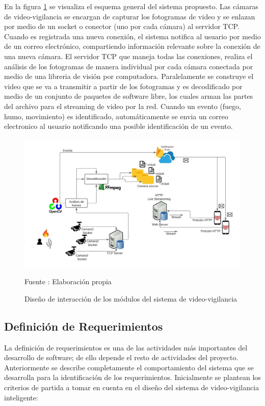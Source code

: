 En la figura \ref{fig:system_desing} se visualiza el esquema general del sistema propuesto. Las cámaras de video-vigilancia se encargan de capturar los fotogramas de video y se enlazan por medio de un socket o conector (uno por cada cámara) al servidor TCP. Cuando es registrada una nueva conexión, el sistema notifica al usuario por medio de un correo electrónico, compartiendo información relevante sobre la conexión de una nueva cámara. El servidor TCP que maneja todas las conexiones, realiza el análisis de los fotogramas de manera individual por cada cámara conectada por medio de una libreria de visión por computadora. Paralelamente se construye el video que se va a transmitir a partir de los fotogramas y es decodificado por medio de un conjunto de paquetes de software libre, los cuales arman las partes del archivo para el streaming de video por la red. Cuando un evento (fuego, humo, movimiento) es identificado, automáticamente se envia un correo electronico al usuario notificando una posible identificación de un evento.\\

\begin{figure}[H]
    \begin{center}
        \includegraphics[width=17cm]{img/capitulo_4/main.jpeg}
        \caption{Diseño de interacción de los módulos del sistema de video-vigilancia}
        Fuente : Elaboración propia
        \label{fig:system_desing}
    \end{center}
\end{figure}

\subsection{Definición de Requerimientos}
La definición de requerimientos es una de las actividades más importantes del desarrollo de software; de ello depende el resto de actividades del proyecto. Anteriormente se describe completamente el comportamiento del sistema que se desarrolla para la identificación de los requerimientos. Inicialmente se plantean los criterios de partida a tomar en cuenta en el diseño del sistema de video-vigilancia inteligente:


